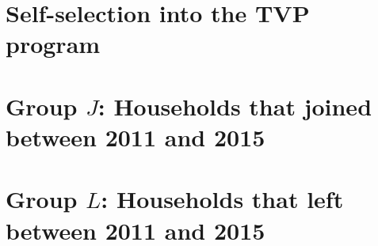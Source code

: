 \documentclass[12pt]{article}
\begin{document}
\clearpage




%
% 
%

\begin{appendices}

  \startcontents[sections]

  \clearpage

\renewcommand\thefigure{\thesection.\arabic{figure}}

\section{Self-selection into the TVP program}

  \setcounter{figure}{0}

  \label{appendix:appendix_selfSelection}

  

\clearpage

\section{Group $J$: Households that joined between 2011 and 2015}

  \setcounter{figure}{0}

  \label{appendix:appendix_groupJ}

  

\clearpage

\clearpage

\section{Group $L$: Households that left between 2011 and 2015}

  \setcounter{figure}{0}


\end{appendices}
\end{document}
